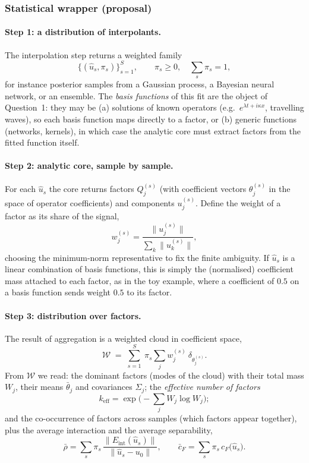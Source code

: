 \documentclass[11pt]{article}
\theoremstyle{plain}
\theoremstyle{definition}
\theoremstyle{remark}
\newcommand{\Eint}{E_{\mathrm{int}}}        %
\begin{document}
\subsubsection{Statistical wrapper (proposal)}\label{sec:wrap}

\paragraph{Step 1: a distribution of interpolants.}
The interpolation step returns a weighted family
\[
\big\{(\hat u_s,\pi_s)\big\}_{s=1}^S,\qquad \pi_s\ge0,\quad \sum_s\pi_s=1,
\]
for instance posterior samples from a Gaussian process, a Bayesian neural network, or an ensemble. The \emph{basis functions} of this fit are the object of Question~1: they may be (a) solutions of known operators (e.g.\ $e^{\lambda t+i\kappa x}$, travelling waves), so each basis function maps directly to a factor, or (b) generic functions (networks, kernels), in which case the analytic core must extract factors from the fitted function itself.

\paragraph{Step 2: analytic core, sample by sample.}
For each $\hat u_s$ the core returns factors $Q^{(s)}_j$ (with coefficient vectors $\theta^{(s)}_j$ in the space of operator coefficients) and components $u^{(s)}_j$. Define the weight of a factor as its share of the signal,
\[
w^{(s)}_j=\frac{\|u^{(s)}_j\|}{\sum_k\|u^{(s)}_k\|},
\]
choosing the minimum-norm representative to fix the finite ambiguity. If $\hat u_s$ is a linear combination of basis functions, this is simply the (normalised) coefficient mass attached to each factor, as in the toy example, where a coefficient of $0.5$ on a basis function sends weight $0.5$ to its factor.

\paragraph{Step 3: distribution over factors.}
The result of aggregation is a weighted cloud in coefficient space,
\[
\mathcal W\;=\;\sum_{s=1}^{S}\ \pi_s\sum_{j}w^{(s)}_j\ \delta_{\theta^{(s)}_j}.
\]
From $\mathcal W$ we read: the dominant factors (modes of the cloud) with their total mass $W_j$, their means $\bar\theta_j$ and covariances $\Sigma_j$; the \emph{effective number of factors}
\[
k_{\mathrm{eff}}=\exp\Big(-\sum_j W_j\log W_j\Big);
\]
and the co-occurrence of factors across samples (which factors appear together), plus the average interaction and the average separability,
\[
\bar\rho=\sum_s\pi_s\,\frac{\|\Eint(\hat u_s)\|}{\|\hat u_s-u_0\|},\qquad \bar c_F=\sum_s\pi_s\,c_F\big(\hat u_s\big).
\]
\end{document}
